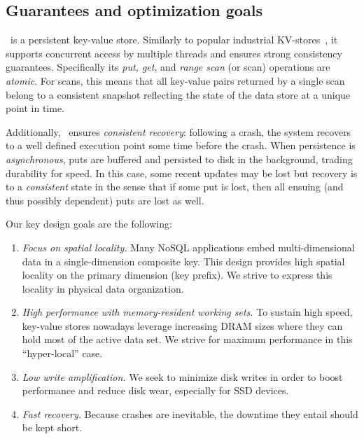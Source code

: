 \subsection{Guarantees and optimization goals}
\sys\ is a persistent key-value store. Similarly to popular industrial KV-stores~\cite{hbase,leveldb,RocksDB}, 
 it supports concurrent access by multiple threads and ensures 
strong consistency guarantees. 
Specifically its \emph{put, get}, and \emph{range scan} (or scan) operations are \emph{atomic}.  
For scans, this means that all key-value pairs returned by a single scan belong to a consistent 
snapshot reflecting the state of the data store at a unique point in time.

Additionally, \sys\ ensures \emph{consistent recovery}: following a crash, the system recovers to a well defined execution 
point some time before the crash. 
When persistence is \emph{asynchronous}, puts are buffered and persisted to disk in the background,  
 trading durability for speed. In this case, some recent updates may be lost but 
 recovery is to a \emph{consistent} state  
in the sense that if some put is lost, then all ensuing (and thus possibly dependent) puts are lost as well.

Our key design goals are the following:
\begin{enumerate}
\item \emph{Focus on spatial locality.}
 Many NoSQL applications embed multi-dimensional data in a single-dimension composite key. 
 This design provides high spatial locality on the primary dimension (key prefix). We strive
 to express this locality in physical data organization.
 
\item \emph{High performance  with memory-resident working sets.}
To sustain high speed, key-value stores nowadays leverage increasing DRAM sizes 
where they can hold most of the active data set. We strive for maximum performance 
in this ``hyper-local'' case.

\item \emph{Low write amplification.} We seek to minimize disk writes in order to boost performance 
and reduce disk wear, especially for SSD devices. 

\item \emph{Fast recovery.}  Because crashes are inevitable, 
the downtime they entail should be kept  short. 
\end{enumerate}

